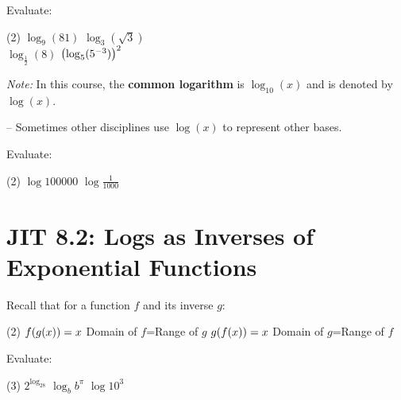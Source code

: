 \documentclass[mathNotesPreamble]{subfiles}
\begin{document}
  \begin{center}
  \end{center}
  \begin{ex*}
    Evaluate:
    \begin{extasks}(2)
      \task $\log_9(81)$
      \task $\log_3(\sqrt3)$\\
      \task $\log_{\frac{1}{2}}(8)$
      \task $\parens{\log_5(5\inv[3])}^2$\\
    \end{extasks}
  \end{ex*}
  \pagebreak
  
  \textit{Note:} In this course, the \textbf{common logarithm} is $\log_{10}(x)$ and is denoted by $\log(x)$. 
  
  -- Sometimes other disciplines use $\log(x)$ to represent other bases.
  \begin{ex*}
    Evaluate:
    \begin{extasks}(2)
      \task $\log 100000$
      \task $\log \frac{1}{1000}$\\
    \end{extasks}
  \end{ex*}
\section{JIT 8.2: Logs as Inverses of Exponential Functions}
  Recall that for a function $f$ and its inverse $g$:
  \begin{tasks}[style=itemize](2)
    \task $f\parens{g(x)}=x$
    \task Domain of $f$=Range of $g$
    \task $g\parens{f(x)}=x$
    \task Domain of $g$=Range of $f$\\
  \end{tasks}
  \begin{center}
  \end{center}
  \begin{ex*}
    Evaluate:
    \begin{extasks}(3)
      \task $2^{\log_28}$
      \task $\log_bb^\pi$
      \task $\log10^3$
    \end{extasks}
  \end{ex*}
  \vfill
  \pagebreak
  
\end{document}
